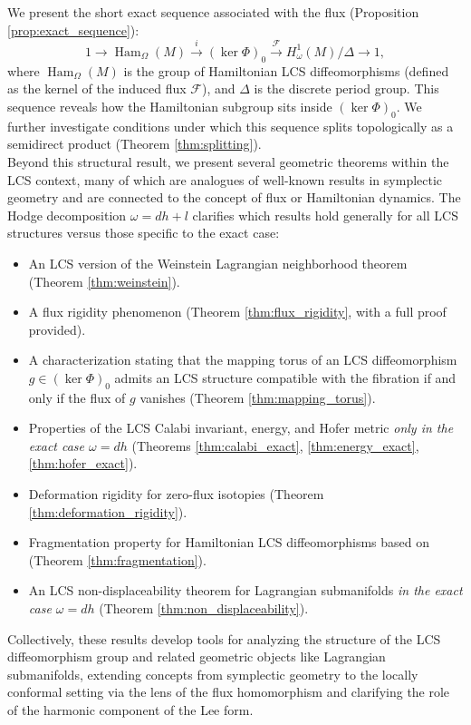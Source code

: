 \documentclass[11pt,a4paper]{amsart}
\theoremstyle{definition}
\theoremstyle{remark}
\newcommand{\Ham}{\operatorname{Ham}}
\begin{document}
	We present the short exact sequence associated with the flux (Proposition \ref{prop:exact_sequence}):
	\[
	1 \longrightarrow \Ham_\Omega(M) \xrightarrow{i} (\ker \Phi)_0 \xrightarrow{\mathcal{F}} H_\omega^1(M)/\Delta \longrightarrow 1,
	\]
	where $\Ham_\Omega(M)$ is the group of Hamiltonian LCS diffeomorphisms (defined as the kernel of the induced flux $\mathcal{F}$), and $\Delta$ is the discrete period group. This sequence reveals how the Hamiltonian subgroup sits inside $(\ker \Phi)_0$. We further investigate conditions under which this sequence splits topologically as a semidirect product (Theorem \ref{thm:splitting}).\\
	
	
	Beyond this structural result, we present several geometric theorems within the LCS context, many of which are analogues of well-known results in symplectic geometry and are connected to the concept of flux or Hamiltonian dynamics. The Hodge decomposition $\omega = dh + l$ clarifies which results hold generally for all LCS structures versus those specific to the exact case:
	\begin{itemize}
		\item An LCS version of the Weinstein Lagrangian neighborhood theorem (Theorem \ref{thm:weinstein}).
		\item A flux rigidity phenomenon (Theorem \ref{thm:flux_rigidity}, with a full proof provided).
		\item A characterization stating that the mapping torus of an LCS diffeomorphism $g \in (\ker \Phi)_0$ admits an LCS structure compatible with the fibration if and only if the flux of $g$ vanishes (Theorem \ref{thm:mapping_torus}).
		\item Properties of the LCS Calabi invariant, energy, and Hofer metric \emph{only in the exact case $\omega = dh$} (Theorems \ref{thm:calabi_exact}, \ref{thm:energy_exact}, \ref{thm:hofer_exact}).
		\item Deformation rigidity for zero-flux isotopies (Theorem \ref{thm:deformation_rigidity}).
		\item Fragmentation property for Hamiltonian LCS diffeomorphisms based on \cite{Banyaga1978} (Theorem \ref{thm:fragmentation}).
		\item An LCS non-displaceability theorem for Lagrangian submanifolds \emph{in the exact case $\omega = dh$} (Theorem \ref{thm:non_displaceability}).
	\end{itemize}
	
	Collectively, these results develop tools for analyzing the structure of the LCS diffeomorphism group and related geometric objects like Lagrangian submanifolds, extending concepts from symplectic geometry to the locally conformal setting via the lens of the flux homomorphism and clarifying the role of the harmonic component of the Lee form.
	
\end{document}
